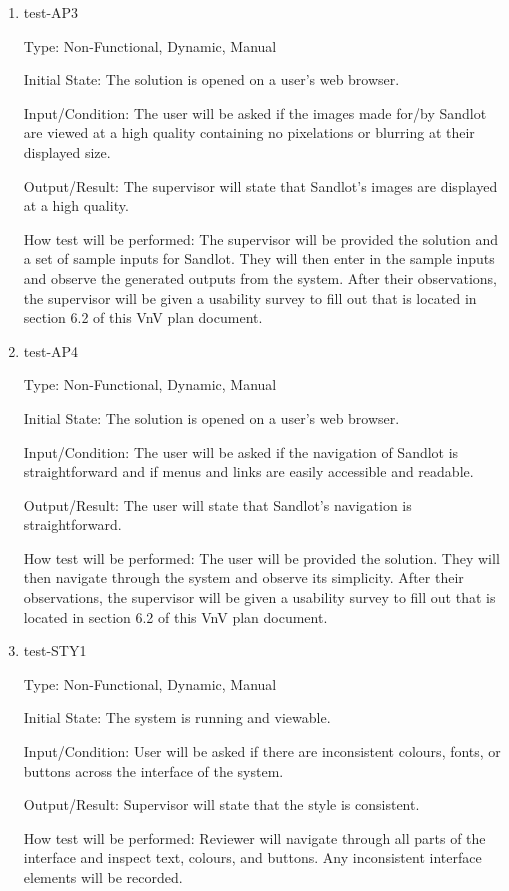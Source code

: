 \documentclass[12pt, titlepage]{article}
\begin{document}
\begin{enumerate}
\item{test-AP3\\}

Type: Non-Functional, Dynamic, Manual

Initial State: The solution is opened on a user's web browser.

Input/Condition: The user will be asked if the images made for/by Sandlot are viewed at
a high quality containing no pixelations or blurring at their displayed size.

Output/Result: The supervisor will state that Sandlot's images are displayed at a high
quality.

How test will be performed: The supervisor will be provided the solution and a set of
sample inputs for Sandlot. They will then enter in the sample inputs and observe the
generated outputs from the system. After their observations, the supervisor will be given
a usability survey to fill out that is located in section 6.2 of this VnV plan document.

\item{test-AP4\\}

Type: Non-Functional, Dynamic, Manual
					
Initial State: The solution is opened on a user's web browser.
					
Input/Condition: The user will be asked if the navigation of Sandlot is straightforward 
and if menus and links are easily accessible and readable.
					
Output/Result: The user will state that Sandlot's navigation is straightforward.
					
How test will be performed: The user will be provided the solution. They will then 
navigate through the system and observe its simplicity. After their observations, 
the supervisor will be given a usability survey to fill out that is located in 
section 6.2 of this VnV plan document.

\item{test-STY1\\}

Type: Non-Functional, Dynamic, Manual
					
Initial State: The system is running and viewable.
					
Input/Condition: User will be asked if there are inconsistent colours,
fonts, or buttons across the interface of the system.
					
Output/Result: Supervisor will state that the style is consistent.
					
How test will be performed: Reviewer will navigate through all parts
of the interface and inspect text, colours, and buttons. Any 
inconsistent interface elements will be recorded. 

\end{enumerate}
\end{document}
